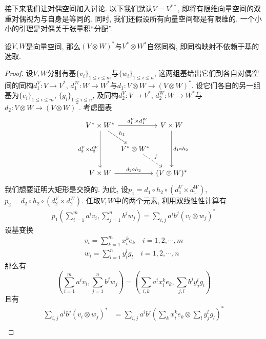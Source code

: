 接下来我们让对偶空间加入讨论. 以下我们默认$V=V^{**}$, 即将有限维向量空间的双重对偶视为与自身是等同的.
同时, 我们还假设所有向量空间都是有限维的.
一个小小的引理是对偶关于张量积``分配''.
\begin{lem}
    设$V,W$是向量空间, 那么$(V\otimes W)^*$与$V^*\otimes W^*$自然同构, 即同构映射不依赖于基的选取.
\end{lem}
\begin{proof}
    设$V,W$分别有基$\{v_i\}_{1\leq i\leq m}$与$\{w_i\}_{1\leq i\leq n}$, 这两组基给出它们到各自对偶空间的同构$d^V_1:V\to V^*$, $d^W_1:W\to W^*$与$d_1:V\otimes W\to (V\otimes W)^*$.
    设它们各自的另一组基为$\{e_i\}_{1\leq i\leq m}$, $\{g_i\}_{1\leq i\leq n}$, 及同构$d^V_2:V\to V^*$, $d^W_2:W\to W^*$与$d_2:V\otimes W\to(V\otimes W)^*$.
    考虑图表
    \begin{equation}
        \begin{tikzcd}[column sep=0]
            V^*\times W^* \arrow[rr, "d^V_1\times d^W_1"] \arrow[dd, "d^V_2\times d^W_2"'] \arrow[dr, "h_1"] & &
            V\times W \arrow[dd, "d_1\circ h_2"]\\
            & V^*\otimes W^* \arrow[dr, dashed, "f"] &\\
            V\times W \arrow[rr, "d_2\circ h_2"] & & (V\otimes W)^*
        \end{tikzcd}\label{comudiag for v*w*=(vw)*}
    \end{equation}
    我们想要证明大矩形是交换的.
    为此, 设$p_1=d_1\circ h_2\circ(d_1^V\times d_1^W)$, $p_2=d_2\circ h_2\circ(d_2^V\times d_2^W)$.
    任取$V,W$中的两个元素, 利用双线性性计算有
    \begin{align*}
        p_1\left(\sum_{i=1}^ma^iv_i,\sum_{j=1}^nb^jw_j\right)=\sum_{i,j}a^ib^j(v_i\otimes w_j)^*
    \end{align*}
    设基变换
    \begin{gather*}
        v_i=\sum_{k=1}^mx^k_ie_k\quad i=1,2,\cdots,m\\
        w_i=\sum_{l=1}^ny^l_ig_l\quad i=1,2,\cdots,n
    \end{gather*}
    那么有
    \begin{equation}
        \left(\sum_{i=1}^ma^iv_i,\sum_{j=1}^nb^jw_j\right)=\left(\sum_{i,k}a^ix^k_ie_k,\sum_{j,l}b^jy^l_jg_l\right)\label{tensor for 2 basis}
    \end{equation}
    且有
    \begin{align*}
        \sum_{i,j}a^ib^j(v_i\otimes w_j)^*&=\sum_{i,j}a^ib^j\left(\sum_{k}x^k_ie_k\otimes\sum_{l}y^l_jg_l\right)^*\\

\end{align*}
\end{proof}
